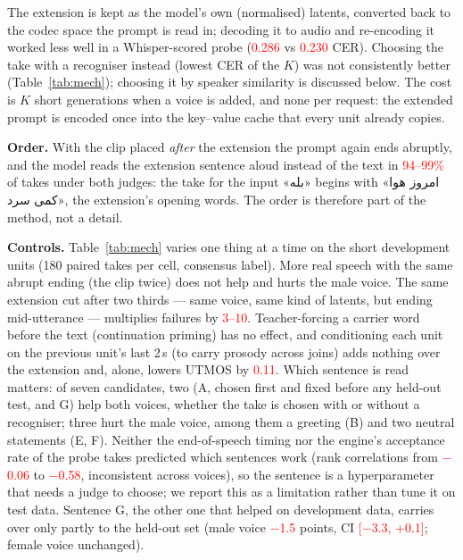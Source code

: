 \documentclass[conference]{IEEEtran}
\newcommand{\fa}[1]{{\persianfont\beginR #1\endR}}
\newcommand{\RES}[1]{\textcolor{red}{#1}}
\begin{document}
The extension is kept as the model's own (normalised) latents, converted back to the codec space the
prompt is read in; decoding it to audio and re-encoding it worked less well in a Whisper-scored probe (\RES{0.286} vs
\RES{0.230} CER).
Choosing the take with a recogniser instead (lowest CER of the $K$) was not consistently
better (Table~\ref{tab:mech}); choosing it by speaker similarity is discussed below. The cost is $K$ short generations when a voice is added, and none per request: the extended prompt is
encoded once into the key--value cache that every unit already copies.

\textbf{Order.} With the clip placed \emph{after} the extension the prompt again ends abruptly, and the model
reads the extension sentence aloud instead of the text in \RES{94--99\%} of takes under both judges: the
take for the input \fa{«بله»} begins with \fa{«امروز هوا کمی سرد»}, the extension's opening words. The order
is therefore part of the method, not a detail.

\textbf{Controls.} Table~\ref{tab:mech} varies one thing at a time on the short development units
(180 paired takes per cell, consensus label). More real speech with the same abrupt ending (the clip twice)
does not help and hurts the male voice. The same extension cut after two thirds --- same voice, same kind of
latents, but ending mid-utterance --- multiplies failures by \RES{3--10}. Teacher-forcing a carrier word
before the text (continuation priming) has no effect, and conditioning each unit on the previous unit's last
2\,s (to carry prosody across joins) adds nothing over the extension and, alone, lowers UTMOS by
\RES{0.11}. Which sentence is read matters: of seven candidates,
two (A, chosen first and fixed before any held-out test, and G) help both voices, whether the take is chosen
with or without a recogniser; three hurt the male voice, among them a greeting (B) and two neutral statements
(E, F). Neither the end-of-speech timing nor the engine's acceptance rate of the probe takes predicted which
sentences work (rank correlations from \RES{$-$0.06} to \RES{$-$0.58}, inconsistent across voices), so the
sentence is a hyperparameter that needs a judge to choose; we report this as a limitation rather than tune
it on test data. Sentence G, the other one that helped on development data, carries over only partly to the
held-out set (male voice \RES{$-$1.5} points, CI \RES{[$-$3.3, +0.1]}; female voice unchanged).
\end{document}
